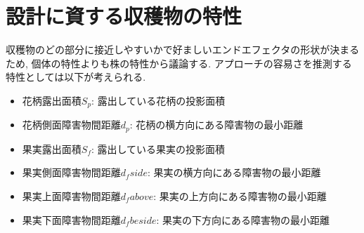 \section{設計に資する収穫物の特性}
収穫物のどの部分に接近しやすいかで好ましいエンドエフェクタの形状が決まるため, 個体の特性よりも株の特性から議論する.
アプローチの容易さを推測する特性としては以下が考えられる.

\begin{itemize}
  \item 花柄露出面積$S_p$: 露出している花柄の投影面積
  \item 花柄側面障害物間距離$d_p$: 花柄の横方向にある障害物の最小距離
  \item 果実露出面積$S_f$: 露出している果実の投影面積
  \item 果実側面障害物間距離$d_fside$: 果実の横方向にある障害物の最小距離
  \item 果実上面障害物間距離$d_fabove$: 果実の上方向にある障害物の最小距離
  \item 果実下面障害物間距離$d_fbeside$: 果実の下方向にある障害物の最小距離
\end{itemize}
